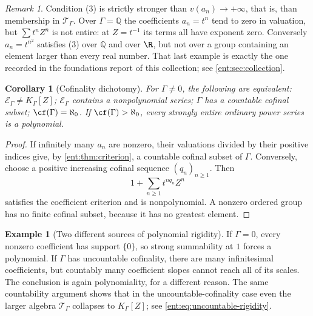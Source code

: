 \documentclass[11pt]{article}
\theoremstyle{plain}
\theoremstyle{plain}
\theoremstyle{plain}
\newtheorem{corollary}[corollary]{Corollary}
\theoremstyle{definition}
\theoremstyle{definition}
\theoremstyle{definition}
\newtheorem{example}[example]{Example}
\theoremstyle{definition}
\theoremstyle{remark}
\newtheorem{remark}[remark]{Remark}
\newcommand{\Q}{\mathbb Q}\newcommand{\Z}{\mathbb Z}\newcommand{\N}{\mathbb N}
\newcommand{\K}{K_\Gamma}\newcommand{\KD}{K_\Delta}
\newcommand{\E}{\mathcal E_\Gamma}
\newcommand{\TT}{\mathcal T_\Gamma}
\begin{document}
\begin{remark}\label{ent:rem:criterion-strength}
Condition (3) is strictly stronger than $v(a_n)\to+\infty$, that is, than
membership in $\TT$. Over $\Gamma=\Q$ the coefficients $a_n=t^n$ tend to zero
in valuation, but $\sum t^nZ^n$ is not entire: at $Z=t^{-1}$ its terms all
have exponent zero. Conversely $a_n=t^{n^2}$ satisfies (3) over $\Q$ and over
$\R$, but not over a group containing an element larger than every real
number. That last example is exactly the one recorded in the foundations
report of this collection; see \cref{ent:sec:collection}.
\end{remark}

\begin{corollary}[Cofinality dichotomy]\label{ent:cor:cofinality}
For $\Gamma\ne0$, the following are equivalent: $\E\ne\K[Z]$; $\E$ contains a
nonpolynomial series; $\Gamma$ has a countable cofinal subset;
$\cf(\Gamma)=\aleph_0$. If $\cf(\Gamma)>\aleph_0$, every strongly entire
ordinary power series is a polynomial.
\end{corollary}
\begin{proof}
If infinitely many $a_n$ are nonzero, their valuations divided by their
positive indices give, by \cref{ent:thm:criterion}, a countable cofinal
subset of $\Gamma$. Conversely, choose a positive increasing cofinal sequence
$(q_n)_{n\ge1}$. Then
\[
 1+\sum_{n\ge1}t^{nq_n}Z^n
\]
satisfies the coefficient criterion and is nonpolynomial. A nonzero ordered
group has no finite cofinal subset, because it has no greatest element.
\end{proof}

\begin{example}[Two different sources of polynomial rigidity]
\label{ent:ex:two-rigidities}
If $\Gamma=0$, every nonzero coefficient has support $\{0\}$, so strong
summability at $1$ forces a polynomial. If $\Gamma$ has uncountable
cofinality, there are many infinitesimal coefficients, but countably many
coefficient slopes cannot reach all of its scales. The conclusion is again
polynomiality, for a different reason. The same countability argument shows
that in the uncountable-cofinality case even the larger algebra $\TT$
collapses to $\K[Z]$; see \eqref{ent:eq:uncountable-rigidity}.
\end{example}
\end{document}
